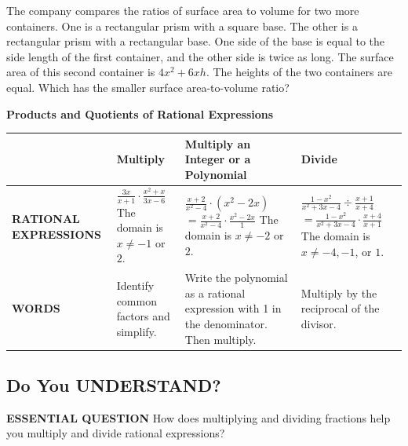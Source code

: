 \documentclass{article}
\newenvironment{concept-summary}{}{}
\newenvironment{tryit}[1]{}{}
\newenvironment{practice}[2]{}{}
\begin{document}
\begin{tryit}{6}
The company compares the ratios of surface area to volume for two more containers. One is a rectangular prism with a square base. The other is a rectangular prism with a rectangular base. One side of the base is equal to the side length of the first container, and the other side is twice as long. The surface area of this second container is $4x^2 + 6xh$. The heights of the two containers are equal. Which has the smaller surface area-to-volume ratio?
\end{tryit}

\begin{concept-summary}
\textbf{Products and Quotients of Rational Expressions}

\begin{tabular}{lp{}p{}p{}}
\toprule
& \textbf{Multiply} & \textbf{Multiply an Integer \newline or a Polynomial} & \textbf{Divide} \\
\midrule
\textbf{RATIONAL \newline EXPRESSIONS} &
$\frac{3x}{x + 1} \cdot \frac{x^2 + x}{3x - 6}$ \newline The domain is $x \neq -1$ or $2$. &
$\frac{x + 2}{x^2 - 4} \cdot (x^2 - 2x)$ \newline $= \frac{x + 2}{x^2 - 4} \cdot \frac{x^2 - 2x}{1}$ \newline The domain is $x \neq -2$ or $2$. &
$\frac{1 - x^2}{x^2 + 3x - 4} \div \frac{x + 1}{x + 4}$ \newline $= \frac{1 - x^2}{x^2 + 3x - 4} \cdot \frac{x + 4}{x + 1}$ \newline The domain is $x \neq -4, -1$, or $1$. \\
\midrule
\textbf{WORDS} & Identify common factors and simplify. & Write the polynomial as a rational expression with 1 in the denominator. Then multiply. & Multiply by the reciprocal of the divisor. \\
\bottomrule
\end{tabular}
\end{concept-summary}

\subsection*{Do You UNDERSTAND?}

\begin{practice}{1}{1}
\textbf{ESSENTIAL QUESTION} How does multiplying and dividing fractions help you multiply and divide rational expressions?
\end{practice}
\end{document}
